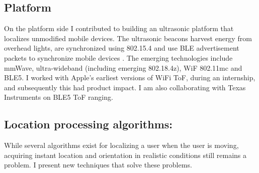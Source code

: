 \documentclass[10pt]{article}
\begin{document}

\subsection{Platform} 
On the platform side I contributed to building an ultrasonic platform that localizes unmodified mobile devices. The ultrasonic beacons harvest energy from overhead lights, are synchronized using 802.15.4 and use BLE advertisement packets to synchronize mobile devices
\cite{rtas-alps-platform, lazik2015alps,lazik2015alpsdemo}. The emerging technologies include mmWave, ultra-wideband (including emerging 802.18.4z), WiF 802.11mc and BLE5.  I worked with Apple's earliest versions of WiFi ToF, during an internship, and subsequently this had product impact. I am also collaborating with Texas Instruments on BLE5 ToF ranging. 

\subsection{Location processing algorithms: }
While several algorithms exist for localizing a user when the user is moving, acquiring instant location and orientation in realistic conditions still remains a problem. I present new techniques that solve these problems. 

\end{document}
